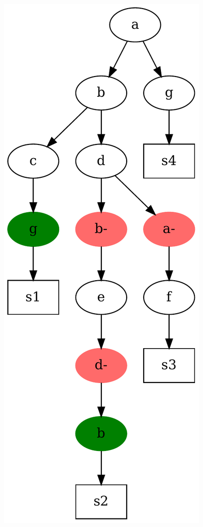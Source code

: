 \documentclass{report}
\begin{document}
  \begin{table}[H]
    \begin{minipage}{0.45\textwidth}
    \centering
    \includegraphics[scale = 0.33]{img/tree.pdf}
    \end{minipage}

\end{table}
\end{document}
